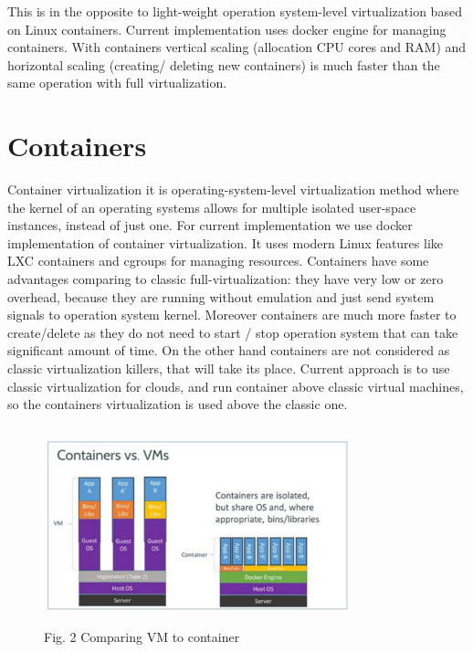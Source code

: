 This is in the opposite to light-weight operation system-level virtualization based on Linux containers. Current implementation uses docker engine for managing containers. With containers vertical scaling (allocation CPU cores and RAM) and horizontal scaling (creating/ deleting new containers) is much faster than the same operation with full virtualization.

\section{Containers}
Container virtualization it is operating-system-level virtualization method where the kernel of an operating systems allows for multiple isolated user-space instances, instead of just one.
For current implementation we use docker implementation of container virtualization. It uses modern Linux features like LXC containers and cgroups for managing resources. 
Containers have some advantages comparing to classic full-virtualization: they have very low or zero overhead, because they are running without emulation and just send system signals to operation system kernel. Moreover containers are much more faster to create/delete as they do not need to start / stop operation system that can take significant amount of time. On the other hand containers are not considered as classic virtualization killers, that will take its place. Current approach is to use classic virtualization for clouds, and run container above classic virtual machines, so the containers virtualization is used above the classic one.

\begin{figure}[h]
  \centering
    \includegraphics[width=335px,height=217px,natwidth=770,natheight=434]{./pictures/docker-vm-container}
    \caption{Fig. 2 Comparing VM to container}
\end{figure}

